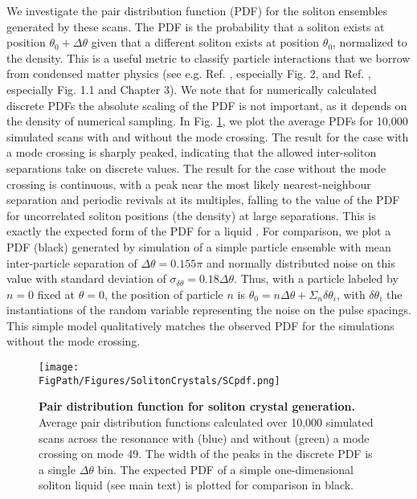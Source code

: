 We investigate the pair distribution function (PDF) for the soliton ensembles generated by these scans. The PDF is the probability that a soliton exists at position $\theta_0+\Delta\theta$ given that a different soliton exists at position $\theta_0$, normalized to the density. This is a useful metric to classify particle interactions that we borrow from condensed matter physics (see e.g. Ref. , especially Fig. 2, and Ref. , especially Fig. 1.1 and Chapter 3). We note that for numerically calculated discrete PDFs the absolute scaling of the PDF is not important, as it depends on the density of numerical sampling. In Fig. \ref{fig:SCpdf}, we plot the average PDFs for 10,000 simulated scans with and without the mode crossing. The result for the case with a mode crossing is sharply peaked, indicating that the allowed inter-soliton separations take on discrete values. The result for the case without the mode crossing is continuous, with a peak near the most likely nearest-neighbour separation and periodic revivals at its multiples, falling to the value of the PDF for uncorrelated soliton positions (the density) at large separations. This is exactly the expected form of the PDF for a liquid \cite{Barker1976,Egami2012}. For comparison, we plot a PDF (black) generated by simulation of a simple particle ensemble with mean inter-particle separation of $\Delta\theta=0.155\pi$ and normally distributed noise on this value with standard deviation of $\sigma_{\delta\theta}=0.18\Delta\theta$. Thus, with a particle labeled by $n = 0$ fixed at $\theta = 0$, the position of particle $n$ is $\theta_0 = n\Delta\theta + \Sigma_n\delta\theta_i$, with $\delta\theta_i$ the instantiations of the random variable representing the noise on the pulse spacings. This simple model qualitatively matches the observed PDF for the simulations without the mode crossing.

\begin{figure}[htpb]
	\begin{center}
		\texttt{[image: \\FigPath/Figures/SolitonCrystals/SCpdf.png]}
	\end{center}
	\caption[Pair distribution function for soliton crystal generation]{\textbf{Pair distribution function for soliton crystal generation.} Average pair distribution functions calculated over 10,000 simulated scans across the resonance with (blue) and without (green) a mode crossing on mode 49. The width of the peaks in the discrete PDF is a single $\Delta\theta$ bin. The expected PDF of a simple one-dimensional soliton liquid (see main text) is plotted for comparison in black.}
	\label{fig:SCpdf}
\end{figure} 


